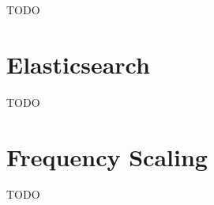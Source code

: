 


TODO

\section{Elasticsearch}

TODO

\section{Frequency Scaling}

TODO



\iffalse
\section{Elasticsearch}
\fi

\iffalse
\section{Java Virtual Machine}

\subsubsection{Monitors}

\subsubsection{Thread Parking}
\fi

\iffalse
\subsection{Synchronization Primitives}

\fi

